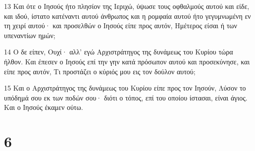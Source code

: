 \par 13 Και ότε ο Ιησούς ήτο πλησίον της Ιεριχώ, ύψωσε τους οφθαλμούς αυτού και είδε, και ιδού, ίστατο κατέναντι αυτού άνθρωπος και η ρομφαία αυτού ήτο γεγυμνωμένη εν τη χειρί αυτού· και προσελθών ο Ιησούς είπε προς αυτόν, Ημέτερος είσαι ή των υπεναντίων ημών;
\par 14 Ο δε είπεν, Ουχί· αλλ' εγώ Αρχιστράτηγος της δυνάμεως του Κυρίου τώρα ήλθον. Και έπεσεν ο Ιησούς επί την γην κατά πρόσωπον αυτού και προσεκύνησε, και είπε προς αυτόν, Τι προστάζει ο κύριός μου εις τον δούλον αυτού;
\par 15 Και ο Αρχιστράτηγος της δυνάμεως του Κυρίου είπε προς τον Ιησούν, Λύσον το υπόδημά σου εκ των ποδών σου· διότι ο τόπος, επί του οποίου ίστασαι, είναι άγιος. Και ο Ιησούς έκαμεν ούτω.

\chapter{6}

